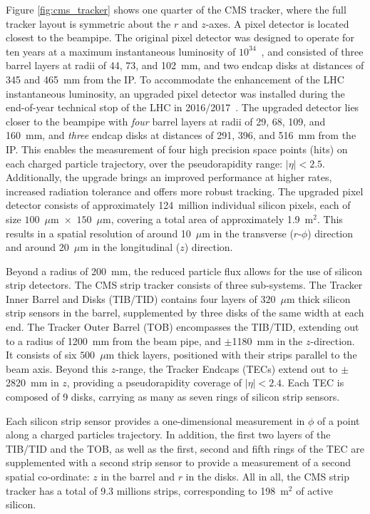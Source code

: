Figure \ref{fig:cms_tracker} shows one quarter of the CMS tracker, where the full tracker layout is symmetric about the $r$ and $z$-axes. A pixel detector is located closest to the beampipe. The original pixel detector was designed to operate for ten years at a maximum instantaneous luminosity of $10^{34}$~\lumi, and consisted of three barrel layers at radii of 44, 73, and 102~mm, and two endcap disks at distances of 345 and 465~mm from the IP. To accommodate the enhancement of the LHC instantaneous luminosity, an upgraded pixel detector was installed during the end-of-year technical stop of the LHC in 2016/2017~\cite{CMS:2012sda}. The upgraded detector lies closer to the beampipe with \textit{four} barrel layers at radii of 29, 68, 109, and 160~mm, and \textit{three} endcap disks at distances of 291, 396, and 516~mm from the IP. This enables the measurement of four high precision space points (hits) on each charged particle trajectory, over the pseudorapidity range: $|\eta|<2.5$. Additionally, the upgrade brings an improved performance at higher rates, increased radiation tolerance and offers more robust tracking. The upgraded pixel detector consists of approximately 124~million individual silicon pixels, each of size $100$~$\mu$m~$\times$~$150$~$\mu$m, covering a total area of approximately 1.9~m$^2$. This results in a spatial resolution of around 10~$\mu$m in the transverse ($r$-$\phi$) direction and around 20~$\mu$m in the longitudinal ($z$) direction.

Beyond a radius of 200~mm, the reduced particle flux allows for the use of silicon strip detectors. The CMS strip tracker consists of three sub-systems. The Tracker Inner Barrel and Disks (TIB/TID) contains four layers of $320$~$\mu$m thick silicon strip sensors in the barrel, supplemented by three disks of the same width at each end. The Tracker Outer Barrel (TOB) encompasses the TIB/TID, extending out to a radius of 1200~mm from the beam pipe, and $\pm$1180~mm in the $z$-direction. It consists of six $500$~$\mu$m thick layers, positioned with their strips parallel to the beam axis. Beyond this $z$-range, the Tracker Endcaps (TECs) extend out to $\pm$2820~mm in $z$, providing a pseudorapidity coverage of $|\eta|<2.4$. Each TEC is composed of 9 disks, carrying as many as seven rings of silicon strip sensors. 

Each silicon strip sensor provides a one-dimensional measurement in $\phi$ of a point along a charged particles trajectory. In addition, the first two layers of the TIB/TID and the TOB, as well as the first, second and fifth rings of the TEC are supplemented with a second strip sensor to provide a measurement of a second spatial co-ordinate: $z$ in the barrel and $r$ in the disks. All in all, the CMS strip tracker has a total of 9.3 millions strips, corresponding to 198~m$^2$ of active silicon.

